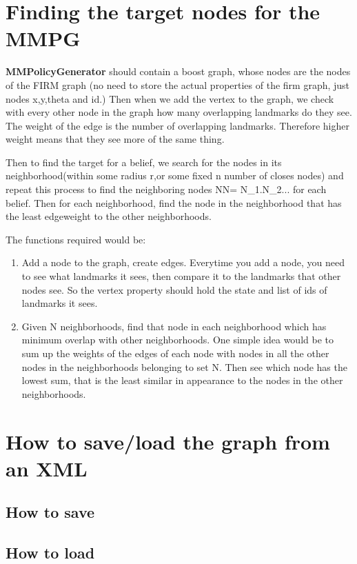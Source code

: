 \section{Finding the target nodes for the MMPG}

\textbf{MMPolicyGenerator} should contain a boost graph, whose nodes are the nodes of the FIRM graph (no need to store the
actual properties of the firm graph, just nodes x,y,theta and id.) Then when we add
the vertex to the graph, we check with every other node in the graph how many overlapping
landmarks do they see. The weight of the edge is the number of overlapping landmarks.
Therefore higher weight means that they see more of the same thing.

Then to find the target for a belief, we search for the nodes in its neighborhood(within some radius r,or some fixed
n number of closes nodes) and repeat this process to find the neighboring nodes NN= {N_1.N_2...} for each belief.
Then for each neighborhood, find the node in the neighborhood that has the least edgeweight to the other neighborhoods.


The functions required would be:

\begin{enumerate}
 \item Add a node to the graph, create edges. Everytime you add a node, you need to see what landmarks it sees, then compare it to the landmarks
      that other nodes see. So the vertex property should hold the state and list of ids of landmarks it sees.
 \item Given N neighborhoods, find that node in each neighborhood which has minimum overlap with other neighborhoods. One simple idea would be 
       to sum up the weights of the edges of each node with nodes in all the other nodes in the neighborhoods belonging to set N. Then
       see which node has the lowest sum, that is the least similar in appearance to the nodes in the other neighborhoods.
\end{enumerate}

\section{How to save/load the graph from an XML}

\subsection{How to save}

\subsection{How to load}

